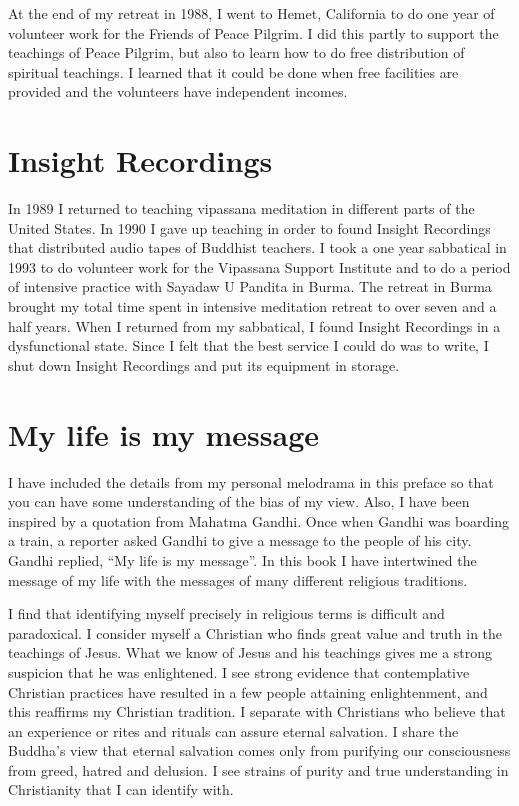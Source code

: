 \documentclass[a5paper,10pt,english]{book}
\begin{document}
\sphinxAtStartPar
At the end of my retreat in 1988, I went to Hemet, California to do one
year of volunteer work for the Friends of Peace Pilgrim. I did this
partly to support the teachings of Peace Pilgrim, but also to learn how
to do free distribution of spiritual teachings. I learned that it could
be done when free facilities are provided and the volunteers have
independent incomes.


\section{Insight Recordings}
\label{\detokenize{preface:insight-recordings}}
\sphinxAtStartPar
In 1989 I returned to teaching vipassana meditation in different parts
of the United States. In 1990 I gave up teaching in order to found
Insight Recordings that distributed audio tapes of Buddhist teachers. I
took a one year sabbatical in 1993 to do volunteer work for the
Vipassana Support Institute and to do a period of intensive practice
with Sayadaw U Pandita in Burma. The retreat in Burma brought my total
time spent in intensive meditation retreat to over seven and a half
years. When I returned from my sabbatical, I found Insight Recordings in
a dysfunctional state. Since I felt that the best service I could do was
to write, I shut down Insight Recordings and put its equipment in
storage.


\section{My life is my message}
\label{\detokenize{preface:my-life-is-my-message}}
\sphinxAtStartPar
I have included the details from my personal melodrama in this preface
so that you can have some understanding of the bias of my view. Also, I
have been inspired by a quotation from Mahatma Gandhi. Once when Gandhi
was boarding a train, a reporter asked Gandhi to give a message to the
people of his city. Gandhi replied, “My life is my message”. In this
book I have intertwined the message of my life with the messages of many
different religious traditions.

\sphinxAtStartPar
I find that identifying myself precisely in religious terms is difficult
and paradoxical. I consider myself a Christian who finds great value and
truth in the teachings of Jesus. What we know of Jesus and his teachings
gives me a strong suspicion that he was enlightened. I see strong
evidence that contemplative Christian practices have resulted in a few
people attaining enlightenment, and this reaffirms my Christian
tradition. I separate with Christians who believe that an experience or
rites and rituals can assure eternal salvation. I share the Buddha’s
view that eternal salvation comes only from purifying our consciousness
from greed, hatred and delusion. I see strains of purity and true
understanding in Christianity that I can identify with.
\end{document}

